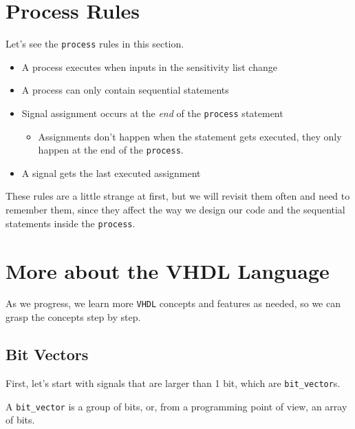 \newpage
\section{Process Rules}
\label{sec:process_rules}

Let's see the \verb|process| rules in this section.

\begin{itemize}

\item A process executes when inputs in the sensitivity list change

\item A process can only contain sequential statements

\item Signal assignment occurs at the \textit{end} of the \verb|process| statement

	\begin{itemize}
	\item Assignments don't happen when the statement gets executed, they only happen at the end of the \verb|process|.
	
	
	\end{itemize}	 

\item A signal gets the last executed assignment

\end{itemize}

These rules are a little strange at first, but we will revisit them often and need to remember them, since they affect the way we design our code and the sequential statements inside the \verb|process|.

\newpage
\section{More about the VHDL Language}

As we progress, we learn more \verb|VHDL| concepts and features as needed, so we can grasp the concepts step by step.

 
\subsection{Bit Vectors}
\label{sub:bit_vectors}

First, let's start with signals that are larger than 1 bit, which are \verb|bit_vector|s.

A \verb|bit_vector| is a group of bits, or, from a programming point of view, an array of bits.\\

